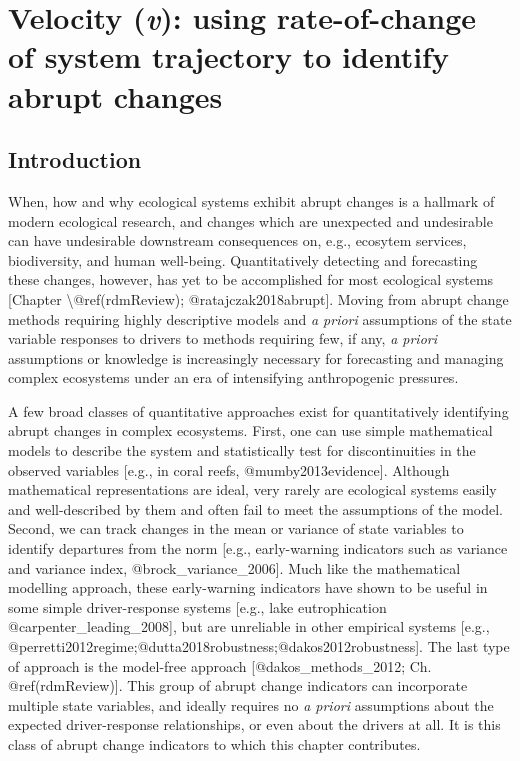 \documentclass[]{article}
\title{}
\author{}
\date{}
\begin{document}
\hypertarget{velocity}{%
\section{\texorpdfstring{Velocity (\emph{v}): using rate-of-change of
system trajectory to identify abrupt
changes}{Velocity (v): using rate-of-change of system trajectory to identify abrupt changes}}\label{velocity}}

\hypertarget{introduction}{%
\subsection{Introduction}\label{introduction}}

When, how and why ecological systems exhibit abrupt changes is a
hallmark of modern ecological research, and changes which are unexpected
and undesirable can have undesirable downstream consequences on, e.g.,
ecosytem services, biodiversity, and human well-being. Quantitatively
detecting and forecasting these changes, however, has yet to be
accomplished for most ecological systems {[}Chapter
\textbackslash{}@ref(rdmReview); @ratajczak2018abrupt{]}. Moving from
abrupt change methods requiring highly descriptive models and \emph{a
priori} assumptions of the state variable responses to drivers to
methods requiring few, if any, \emph{a priori} assumptions or knowledge
is increasingly necessary for forecasting and managing complex
ecosystems under an era of intensifying anthropogenic pressures.

A few broad classes of quantitative approaches exist for quantitatively
identifying abrupt changes in complex ecosystems. First, one can use
simple mathematical models to describe the system and statistically test
for discontinuities in the observed variables {[}e.g., in coral reefs,
@mumby2013evidence{]}. Although mathematical representations are ideal,
very rarely are ecological systems easily and well-described by them and
often fail to meet the assumptions of the model. Second, we can track
changes in the mean or variance of state variables to identify
departures from the norm {[}e.g., early-warning indicators such as
variance and variance index, @brock\_variance\_2006{]}. Much like the
mathematical modelling approach, these early-warning indicators have
shown to be useful in some simple driver-response systems {[}e.g., lake
eutrophication @carpenter\_leading\_2008{]}, but are unreliable in other
empirical systems {[}e.g.,
@perretti2012regime;@dutta2018robustness;@dakos2012robustness{]}. The
last type of approach is the model-free approach
{[}@dakos\_methods\_2012; Ch. @ref(rdmReview){]}. This group of abrupt
change indicators can incorporate multiple state variables, and ideally
requires no \emph{a priori} assumptions about the expected
driver-response relationships, or even about the drivers at all. It is
this class of abrupt change indicators to which this chapter
contributes.
\end{document}
